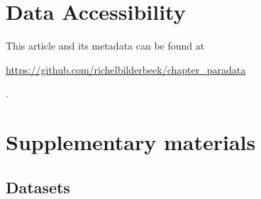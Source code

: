 \section{Data Accessibility}

This article and its metadata can be found at 
\begin{sloppypar}\url{https://github.com/richelbilderbeek/chapter_paradata}\end{sloppypar}.




\newpage
\appendix
\section{Supplementary materials}

\renewcommand{\thefigure}{S\arabic{figure}}
\setcounter{figure}{0}

\renewcommand{\thetable}{S\arabic{table}}
\setcounter{table}{0}

\subsection{Datasets}



